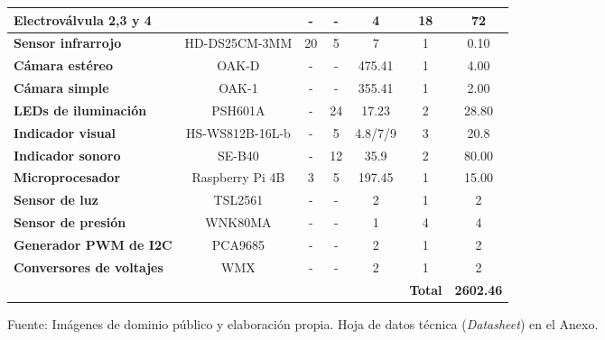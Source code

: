 \begin{mytable}[H]
\begin{tabular}{lcccc|c|c|}
		\multicolumn{1}{|l|}{\cellcolor[HTML]{C0C0C0}\textbf{Electroválvula 2,3 y 4}} &  & - & - & 4 & 18 & 72 \\ \hline
		\multicolumn{1}{|l|}{\cellcolor[HTML]{C0C0C0}\textbf{Sensor infrarrojo}} & HD-DS25CM-3MM & 20 & 5 & 7 & 1 & 0.10 \\ \hline
		\multicolumn{1}{|l|}{\cellcolor[HTML]{C0C0C0}\textbf{Cámara estéreo}} & OAK-D & - & - & 475.41 & 1 & 4.00 \\ \hline
		\multicolumn{1}{|l|}{\cellcolor[HTML]{C0C0C0}\textbf{Cámara simple}} & OAK-1 & - & - & 355.41 & 1 & 2.00 \\ \hline
		\multicolumn{1}{|l|}{\cellcolor[HTML]{C0C0C0}\textbf{LEDs de iluminación}} & PSH601A & - & 24 & 17.23 & 2 & 28.80 \\ \hline
		\multicolumn{1}{|l|}{\cellcolor[HTML]{C0C0C0}\textbf{Indicador visual}} & HS-WS812B-16L-b & - & 5 & 4.8/7/9 & 3 & 20.8 \\ \hline
		\multicolumn{1}{|l|}{\cellcolor[HTML]{C0C0C0}\textbf{Indicador sonoro}} & SE-B40 & - & 12 & 35.9 & 2 & 80.00 \\ \hline
		\multicolumn{1}{|l|}{\cellcolor[HTML]{C0C0C0}\textbf{Microprocesador}} & Raspberry Pi 4B & 3 & 5 & 197.45 & 1 & 15.00 \\ \hline
		\multicolumn{1}{|l|}{\cellcolor[HTML]{C0C0C0}\textbf{Sensor de luz}} & TSL2561 & - & - & 2 & 1 & 2 \\ \hline
		\multicolumn{1}{|l|}{\cellcolor[HTML]{C0C0C0}\textbf{Sensor de presión}} & WNK80MA & - & - & 1 & 4 & 4 \\ \hline
		\multicolumn{1}{|l|}{\cellcolor[HTML]{C0C0C0}\textbf{Generador PWM de I2C}} & PCA9685 & - & - & 2 & 1 & 2 \\ \hline
		\multicolumn{1}{|l|}{\cellcolor[HTML]{C0C0C0}\textbf{Conversores de voltajes}} & WMX & - & - & 2 & 1 & 2 \\ \hline
		&  &  &  &  &  \textbf{Total} & \textbf{2602.46} \\ \cline{6-7} 
	\end{tabular}
	\begin{myflushcenteraftertable}	
		Fuente: Imágenes de dominio público y elaboración propia. Hoja de datos técnica (\textit{Datasheet}) en el Anexo.
	\end{myflushcenteraftertable}
\end{mytable}



